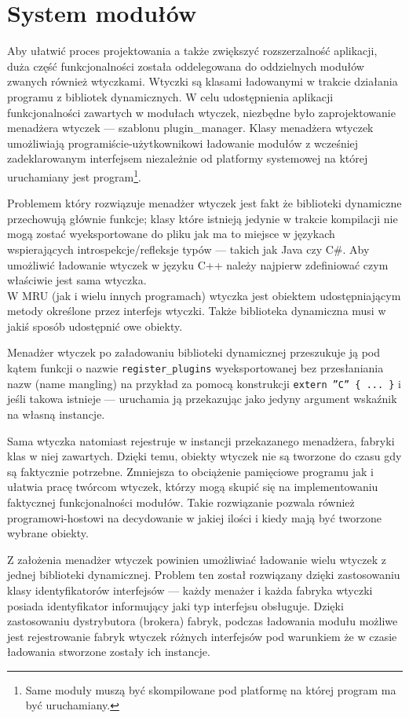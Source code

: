 \section{System modułów}
\label{system-modulow}
\par
Aby ułatwić proces projektowania a także zwiększyć rozszerzalność aplikacji, duża część funkcjonalności została oddelegowana do oddzielnych modułów zwanych również wtyczkami.
Wtyczki są klasami ładowanymi w trakcie działania programu z bibliotek dynamicznych.
W celu udostępnienia aplikacji funkcjonalności zawartych w modułach wtyczek, niezbędne było zaprojektowanie menadżera wtyczek --- szablonu plugin\_manager.
Klasy menadżera wtyczek umożliwiają programiście-użytkownikowi ładowanie modułów z wcześniej zadeklarowanym interfejsem niezależnie od platformy systemowej na której uruchamiany jest program\footnote{Same moduły muszą być skompilowane pod platformę na której program ma być uruchamiany.}.

\par
Problemem który rozwiązuje menadżer wtyczek jest fakt że biblioteki dynamiczne przechowują głównie funkcje; klasy które istnieją jedynie w trakcie kompilacji nie mogą zostać wyeksportowane do pliku jak ma to miejsce w językach wspierających introspekcje/refleksje typów --- takich jak Java czy C\#.
Aby umożliwić ładowanie wtyczek w języku C++ należy najpierw zdefiniować czym właściwie jest sama wtyczka.\\

W MRU (jak i wielu innych programach) wtyczka jest obiektem udostępniającym metody określone przez interfejs wtyczki. Także biblioteka dynamiczna musi w jakiś sposób udostępnić owe obiekty.

\par
Menadżer wtyczek po załadowaniu biblioteki dynamicznej przeszukuje ją pod kątem funkcji o nazwie \texttt{register\_plugins} wyeksportowanej bez przesłaniania nazw (name mangling) na przykład za pomocą konstrukcji \texttt{extern ''C'' \{ ... \}} i jeśli takowa istnieje --- uruchamia ją przekazując jako jedyny argument wskaźnik na własną instancje.
\par
Sama wtyczka natomiast rejestruje w instancji przekazanego menadżera, fabryki klas w niej zawartych.
Dzięki temu, obiekty wtyczek nie są tworzone do czasu gdy są faktycznie potrzebne. Zmniejsza to obciążenie pamięciowe programu jak i ułatwia pracę twórcom wtyczek, którzy mogą skupić się na implementowaniu faktycznej funkcjonalności modułów. Takie rozwiązanie pozwala również programowi-hostowi na decydowanie w jakiej ilości i kiedy mają być tworzone wybrane obiekty.
\par
Z założenia menadżer wtyczek powinien umożliwiać ładowanie wielu wtyczek z jednej biblioteki dynamicznej.
Problem ten został rozwiązany dzięki zastosowaniu klasy identyfikatorów interfejsów --- każdy menażer i każda fabryka wtyczki posiada identyfikator informujący jaki typ interfejsu obsługuje. Dzięki zastosowaniu dystrybutora (brokera) fabryk, podczas ładowania modułu możliwe jest rejestrowanie fabryk wtyczek różnych interfejsów pod warunkiem że w czasie ładowania stworzone zostały ich instancje.

